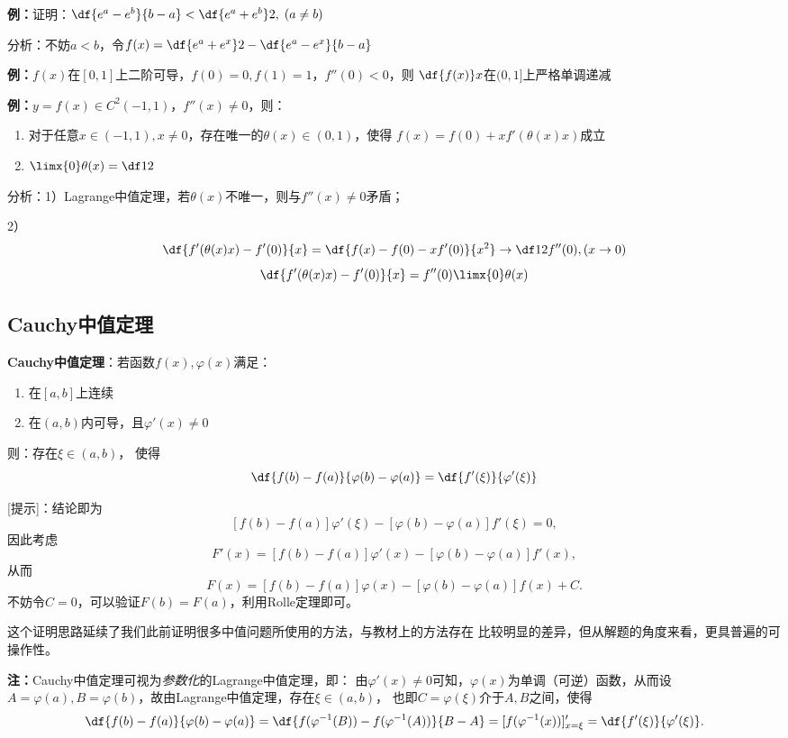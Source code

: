 {\bf 例：}证明：$\df{e^a-e^b}{b-a}<\df{e^a+e^b}2,\;(a\ne b)$

分析：不妨$a<b$，令$f(x)=\df{e^a+e^x}2-\df{e^a-e^x}{b-a}$

{\bf 例：}$f(x)$在$[0,1]$上二阶可导，$f(0)=0,f(1)=1$，$f''(0)<0$，则
$\df{f(x)}x$在$(0,1]$上严格单调递减

{\bf 例：}$y=f(x)\in C^2(-1,1)$，$f''(x)\ne 0$，则：
\begin{enumerate}[1)]
  \setlength{\itemindent}{1cm}
  \item 对于任意$x\in(-1,1),x\ne 0$，存在唯一的$\theta(x)\in(0,1)$，使得
  $f(x)=f(0)+xf'(\theta(x)x)$成立
  \item $\limx{0}\theta(x)=\df12$
\end{enumerate}

分析：1）Lagrange中值定理，若$\theta(x)$不唯一，则与$f''(x)\ne 0$矛盾；

2）
$$\df{f'(\theta(x)x)-f'(0)}{x}=\df{f(x)-f(0)-xf'(0)}{x^2}\to\df12f''(0),(x\to0)$$
$$\df{f'(\theta(x)x)-f'(0)}{x}=f''(0)\limx{0}\theta(x)$$

\subsection{Cauchy中值定理}

\begin{thx}
	{\bf Cauchy中值定理}：若函数$f(x),\varphi(x)$满足： 
	\begin{enumerate}[(1)]
	  \setlength{\itemindent}{1cm}
	  \item 在$[a,b]$上连续 
	  \item 在$(a,b)$内可导，且$\varphi'(x)\ne 0$ 
	\end{enumerate}
	则：存在$\xi\in(a,b)$， 使得
	$$\df{f(b)-f(a)}{\varphi(b)-\varphi(a)}=\df{f'(\xi)}{\varphi'(\xi)}$$
\end{thx}

[提示]：结论即为
$$[f(b)-f(a)]\varphi'(\xi)-[\varphi(b)-\varphi(a)]f'(\xi)=0,$$
因此考虑
$$F'(x)=[f(b)-f(a)]\varphi'(x)-[\varphi(b)-\varphi(a)]f'(x),$$
从而
$$F(x)=[f(b)-f(a)]\varphi(x)-[\varphi(b)-\varphi(a)]f(x)+C.$$
不妨令$C=0$，可以验证$F(b)=F(a)$，利用Rolle定理即可。

这个证明思路延续了我们此前证明很多中值问题所使用的方法，与教材上的方法存在
比较明显的差异，但从解题的角度来看，更具普遍的可操作性。

{\bf 注：}Cauchy中值定理可视为{\it 参数化}的Lagrange中值定理，即：
由$\varphi'(x)\ne 0$可知，$\varphi(x)$为单调（可逆）函数，从而设
$A=\varphi(a),B=\varphi(b)$，故由Lagrange中值定理，存在$\xi\in(a,b)$，
也即$C=\varphi(\xi)$介于$A,B$之间，使得
$$\df{f(b)-f(a)}{\varphi(b)-\varphi(a)}
=\df{f(\varphi^{-1}(B))-f(\varphi^{-1}(A))}{B-A}
=[f(\varphi^{-1}(x))]'_{x=\xi}=\df{f'(\xi)}{\varphi'(\xi)}.$$

